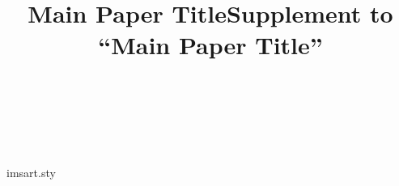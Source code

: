 \begin{filecontents*}{imsart.sty}
\end{filecontents*}
\documentclass{imsart}

\begin{frontmatter}
\title{Main Paper Title}
\begin{aug}
\author[A]{~}
\address[A]{University A}
\end{aug}
\begin{abstract}Main abstract text.\end{abstract}
\end{frontmatter}
\section{Intro} Body.
\begin{thebibliography}{1} A. Ref.\end{thebibliography}
\begin{frontmatter}
\title{Supplement to ``Main Paper Title''}
\begin{aug}
\author[A]{~}
\address[A]{University A}
\end{aug}
\begin{abstract}Supplement abstract text.\end{abstract}
\end{frontmatter}
\section{More} Extra.

